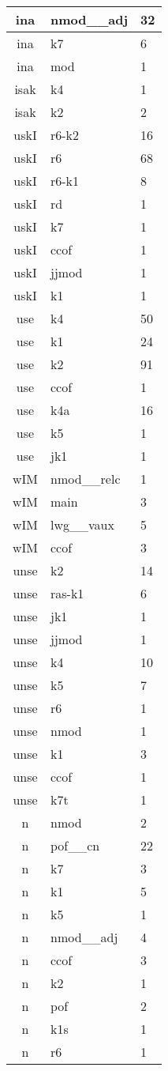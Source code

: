 \documentclass[a4 paper]{article}
\begin{document}
\begin{longtable}{cp{}p{}}
ina & nmod\_\_adj & 32\\ \midrule ina & k7 & 6\\ \midrule ina & mod & 1\\ \midrule 
isak & k4 & 1\\ \midrule isak & k2 & 2\\ \midrule 
uskI & r6-k2 & 16\\ \midrule uskI & r6 & 68\\ \midrule uskI & r6-k1 & 8\\ \midrule uskI & rd & 1\\ \midrule uskI & k7 & 1\\ \midrule uskI & ccof & 1\\ \midrule uskI & jjmod & 1\\ \midrule uskI & k1 & 1\\ \midrule 
use & k4 & 50\\ \midrule use & k1 & 24\\ \midrule use & k2 & 91\\ \midrule use & ccof & 1\\ \midrule use & k4a & 16\\ \midrule use & k5 & 1\\ \midrule use & jk1 & 1\\ \midrule 
wIM & nmod\_\_relc & 1\\ \midrule wIM & main & 3\\ \midrule wIM & lwg\_\_vaux & 5\\ \midrule wIM & ccof & 3\\ \midrule 
unse & k2 & 14\\ \midrule unse & ras-k1 & 6\\ \midrule unse & jk1 & 1\\ \midrule unse & jjmod & 1\\ \midrule unse & k4 & 10\\ \midrule unse & k5 & 7\\ \midrule unse & r6 & 1\\ \midrule unse & nmod & 1\\ \midrule unse & k1 & 3\\ \midrule unse & ccof & 1\\ \midrule unse & k7t & 1\\ \midrule 
n & nmod & 2\\ \midrule n & pof\_\_cn & 22\\ \midrule n & k7 & 3\\ \midrule n & k1 & 5\\ \midrule n & k5 & 1\\ \midrule n & nmod\_\_adj & 4\\ \midrule n & ccof & 3\\ \midrule n & k2 & 1\\ \midrule n & pof & 2\\ \midrule n & k1s & 1\\ \midrule n & r6 & 1\\ \midrule 

\end{longtable}
\end{document}
